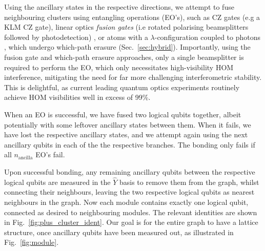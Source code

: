 \documentclass[aps,rmp,twocolumn,amsmath,amssymb,nofootinbib,superscriptaddress,longbibliography,floatfix]{revtex4-1}
\begin{document}
Using the ancillary states in the respective directions, we attempt to fuse neighbouring clusters using entangling operations (EO's), such as CZ gates (e.g a KLM CZ gate), linear optics \emph{fusion gates} (i.e rotated polarising beamsplitters followed by photodetection) \cite{bib:BrowneRudolph05}, or atoms with a $\lambda$-configuration coupled to photons \cite{bib:BarrettKok05}, which undergo which-path erasure (Sec.~\ref{sec:hybrid}). Importantly, using the fusion gate and which-path erasure approaches, only a single beamsplitter is required to perform the EO, which only necessitates high-visibility HOM interference, mitigating the need for far more challenging interferometric stability. This is delightful, as current leading quantum optics experiments routinely achieve HOM visibilities well in excess of 99\%.

When an EO is successful, we have fused two logical qubits together, albeit potentially with some leftover ancillary states between them. When it fails, we have lost the respective ancillary states, and we attempt again using the next ancillary qubits in each of the the respective branches. The bonding only fails if all $n_\mathrm{ancilla}$ EO's fail.

Upon successful bonding, any remaining ancillary qubits between the respective logical qubits are measured in the $\hat{Y}$ basis to remove them from the graph, whilst connecting their neighbours, leaving the two respective logical qubits as nearest neighbours in the graph. Now each module contains exactly one logical qubit, connected as desired to neighbouring modules. The relevant identities are shown in Fig.~\ref{fig:plus_cluster_ident}. Our goal is for the entire graph to have a lattice structure, once ancillary qubits have been measured out, as illustrated in Fig.~\ref{fig:module}.
\end{document}
